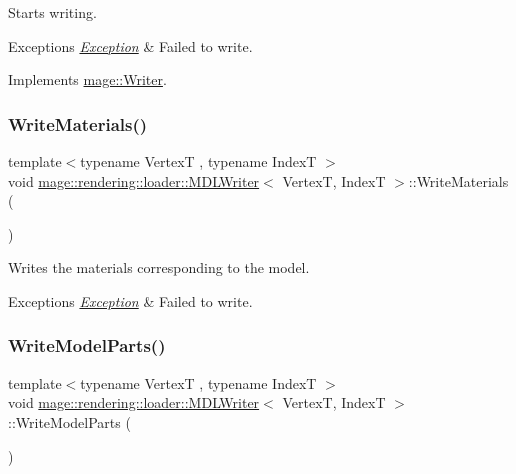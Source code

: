 Starts writing.


\begin{DoxyExceptions}{Exceptions}
{\em \hyperlink{classmage_1_1_exception}{Exception}} & Failed to write. \\
\hline
\end{DoxyExceptions}


Implements \hyperlink{classmage_1_1_writer_a9baf695ef7f6180bef883f60bcb3ac07}{mage\+::\+Writer}.

\hypertarget{classmage_1_1rendering_1_1loader_1_1_m_d_l_writer_afcd1eca27b5854b0f0406dbcae135499}{}\label{classmage_1_1rendering_1_1loader_1_1_m_d_l_writer_afcd1eca27b5854b0f0406dbcae135499} 
\subsubsection{\texorpdfstring{Write\+Materials()}{WriteMaterials()}}
{\footnotesize\ttfamily template$<$typename VertexT , typename IndexT $>$ \\
void \hyperlink{classmage_1_1rendering_1_1loader_1_1_m_d_l_writer}{mage\+::rendering\+::loader\+::\+M\+D\+L\+Writer}$<$ VertexT, IndexT $>$\+::Write\+Materials (\begin{DoxyParamCaption}{ }\end{DoxyParamCaption})\hspace{0.3cm}{\ttfamily [private]}}

Writes the materials corresponding to the model.


\begin{DoxyExceptions}{Exceptions}
{\em \hyperlink{classmage_1_1_exception}{Exception}} & Failed to write. \\
\hline
\end{DoxyExceptions}
\hypertarget{classmage_1_1rendering_1_1loader_1_1_m_d_l_writer_a8fcd997a51d7a46149596d332ebdb8e1}{}\label{classmage_1_1rendering_1_1loader_1_1_m_d_l_writer_a8fcd997a51d7a46149596d332ebdb8e1} 
\subsubsection{\texorpdfstring{Write\+Model\+Parts()}{WriteModelParts()}}
{\footnotesize\ttfamily template$<$typename VertexT , typename IndexT $>$ \\
void \hyperlink{classmage_1_1rendering_1_1loader_1_1_m_d_l_writer}{mage\+::rendering\+::loader\+::\+M\+D\+L\+Writer}$<$ VertexT, IndexT $>$\+::Write\+Model\+Parts (\begin{DoxyParamCaption}{ }\end{DoxyParamCaption})\hspace{0.3cm}{\ttfamily [private]}}

